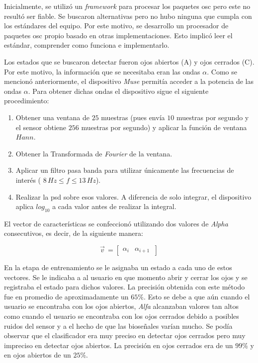Inicialmente, se utilizó un \emph{framework} para procesar los paquetes \acrshort{osc} pero este no resultó ser fiable. Se buscaron alternativas pero no hubo ninguna que cumpla con los estándares del equipo. Por este motivo, se desarrollo un procesador de paquetes \acrshort{osc} propio basado en otras implementaciones. Esto implicó leer el estándar, comprender como funciona e implementarlo.
 
 Los estados que se buscaron detectar fueron ojos abiertos (A) y ojos cerrados (C). Por este motivo, la información que se necesitaba eran las ondas $\alpha$. Como se mencionó anteriormente, el dispositivo \emph{Muse} permitía acceder a la potencia de las ondas $\alpha$. Para obtener dichas ondas el dispositivo sigue el siguiente procedimiento:
 
 \begin{enumerate}
 \item Obtener una ventana de $25$ muestras (pues envía $10$ muestras por segundo y el sensor obtiene $256$ muestras por segundo) y aplicar la función de ventana $Hann$.
 \item Obtener la Transformada de \emph{Fourier} de la ventana.
 \item Aplicar un filtro pasa banda para utilizar únicamente las frecuencias de interés ( $ 8 \, Hz \leq f \leq 13 \, Hz$).
 \item Realizar la \acrshort{psd} sobre esos valores. A diferencia de solo integrar, el dispositivo aplica $log_{10}$  a cada valor antes de realizar la integral.
 \end{enumerate}

El vector de características se confeccionó utilizando dos valores de \emph{Alpha} consecutivos, es decir, de la siguiente manera:

\[
  \vec{v}^{\, }=
  \left[ {\begin{array}{cc}
   \alpha_{i}  & \alpha_{i + 1}  \     \end{array} } \right]
\]

En la etapa de entrenamiento se le asignaba un estado a cada uno de estos vectores. Se le indicaba a al usuario en que momento abrir y cerrar los ojos y se registraba el estado para dichos valores. La precisión obtenida con este método fue en promedio de aproximadamente un $65\%$. Esto se debe a que aún cuando el usuario se encontraba con los ojos abiertos, \emph{Alfa} alcanzaban valores tan altos como cuando el usuario se encontraba con los ojos cerrados debido a posibles ruidos del sensor y a el hecho de que las bioseñales varían mucho. Se podía observar que el clasificador era muy preciso en detectar ojos cerrados pero muy impreciso en detectar ojos abiertos. La precisión en ojos cerrados era de un $99\%$ y en ojos abiertos de un $25\%$.

